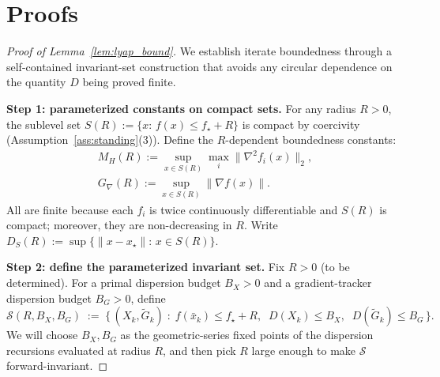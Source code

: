 \documentclass[review,onefignum,onetabnum]{siamart171218}
\begin{document}
	
	\section{Proofs}\label{app:proofs}
	
	\begin{proof}[Proof of Lemma~\ref{lem:lyap_bound}]
		We establish iterate boundedness through a self-contained
		invariant-set construction that avoids any circular dependence
		on the quantity $D$ being proved finite.
		
		\smallskip
		\noindent\textbf{Step 1: parameterized constants on compact sets.}
		For any radius $R>0$, the sublevel set
		$S(R):=\{x:\,f(x)\le f_\star+R\}$
		is compact by coercivity (Assumption~\ref{ass:standing}(3)).
		Define the $R$-dependent boundedness constants:
		\begin{gather*}
			M_H(R):=\sup_{x\in S(R)}\max_i\|\nabla^2 f_i(x)\|_2,\\
			G_\nabla(R):=\sup_{x\in S(R)}\|\nabla f(x)\|.
		\end{gather*}
		All are finite because each $f_i$ is twice continuously differentiable
		and $S(R)$ is compact; moreover, they are non-decreasing in $R$.
		Write $D_S(R):=\sup\{\|x-x_\star\|:\,x\in S(R)\}$.
		
		\smallskip
		\noindent\textbf{Step 2: define the parameterized invariant set.}
		Fix $R>0$ (to be determined).
		For a primal dispersion budget $B_X>0$ and a gradient-tracker
		dispersion budget $B_G>0$, define
		\[
		\mathcal S(R,B_X,B_G) \;:=\;
		\bigl\{\,(X_k,\tilde G_k)\;:\;
		f(\bar x_k)\le f_\star+R,\;\;
		D(X_k)\le B_X,\;\;
		D(\tilde G_k)\le B_G
		\,\bigr\}.
		\]
		We will choose $B_X,B_G$ as the geometric-series fixed points of the
		dispersion recursions evaluated at radius $R$, and then pick $R$ large
		enough to make $\mathcal S$ forward-invariant.
		

\end{proof}
\end{document}
